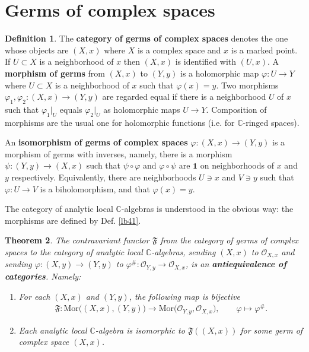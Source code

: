 \documentclass[12pt,b5paper,notitlepage]{report}
\theoremstyle{definition}
\newtheorem{df}{Definition}[section]
\theoremstyle{plain}
\newtheorem{thm}[df]{Theorem}
\newcommand{\fk}{\mathfrak}
\newcommand{\id}{\mathbf{1}}
\newcommand{\scr}{\mathscr}
\newcommand{\Cbb}{\mathbb C}
\newcommand{\Mor}{\mathrm{Mor}}
\numberwithin{equation}{section}
\begin{document}
\section{Germs of complex spaces}


\begin{df}
The \textbf{category of germs of complex spaces} denotes the one whose objects are $(X,x)$ where $X$ is a complex space and $x$ is a marked point. If $U\subset X$ is a neighborhood of $x$ then $(X,x)$ is identified with $(U,x)$. A \textbf{morphism of germs} from $(X,x)$ to $(Y,y)$ is a holomorphic map $\varphi:U\rightarrow Y$ where $U\subset X$ is a neighborhood of $x$ such that $\varphi(x)=y$. Two morphisms $\varphi_1,\varphi_2:(X,x)\rightarrow (Y,y)$ are regarded equal if there is a neighborhood $U$ of $x$ such that $\varphi_1|_U$ equals $\varphi_2|_U$ as holomorphic maps $U\rightarrow Y$. Composition of morphisms are the usual one for holomorphic functions (i.e. for $\Cbb$-ringed spaces). 

An \textbf{isomorphism of germs of complex spaces} $\varphi:(X,x)\rightarrow(Y,y)$ is a morphism of germs with inverses, namely, there is a morphism $\psi:(Y,y)\rightarrow (X,x)$ such that $\psi\circ\varphi$ and $\varphi\circ\psi$ are $\id$ on neighborhoods of $x$ and $y$ respectively. Equivalently, there are neighborhoods $U\ni x$ and $V\ni y$ such that $\varphi:U\rightarrow V$ is a biholomorphism, and that $\varphi(x)=y$. \hfill\qedsymbol
\end{df}




The category of analytic local $\Cbb$-algebras is understood in the obvious way: the morphisms are defined by Def. \ref{lb41}.


\begin{thm}\label{lb19}
The contravariant functor $\fk F$ from the category of germs of complex spaces to the category of analytic local $\Cbb$-algebras, sending $(X,x)$ to $\scr O_{X,x}$ and sending $\varphi:(X,y)\rightarrow(Y,y)$ to $\varphi^\#:\scr O_{Y,y}\rightarrow\scr O_{X,x}$, is an \textbf{antiequivalence of categories}.  Namely:
\begin{enumerate}[label=(\arabic*)]
\item For each $(X,x)$ and $(Y,y)$, the following map is bijective
\begin{align}
\fk F:\Mor\big((X,x),(Y,y)\big)\rightarrow \Mor\big(\scr O_{Y,y},\scr O_{X,x}\big),\qquad \varphi\mapsto\varphi^\#.\label{eq15}
\end{align}
\item Each analytic local $\Cbb$-algebra is isomorphic to $\fk F((X,x))$ for some germ of complex space $(X,x)$.
\end{enumerate}
\end{thm}
\end{document}
